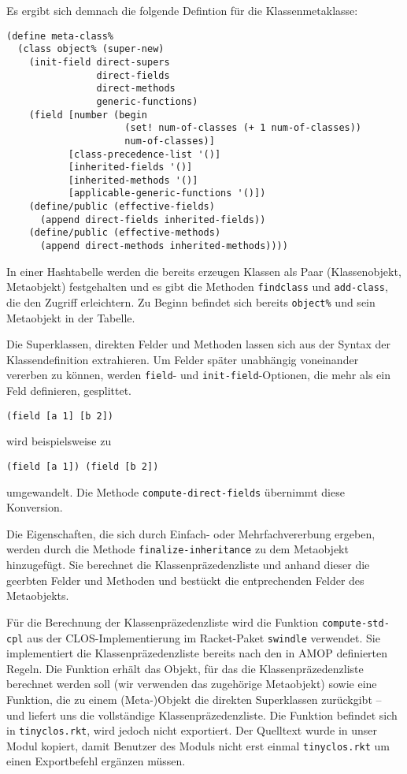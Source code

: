 Es ergibt sich demnach die folgende Defintion für die Klassenmetaklasse:

\begin{lstlisting}
(define meta-class%
  (class object% (super-new)
    (init-field direct-supers
                direct-fields
                direct-methods
                generic-functions)
    (field [number (begin 
                     (set! num-of-classes (+ 1 num-of-classes))
                     num-of-classes)]
           [class-precedence-list '()]
           [inherited-fields '()]
           [inherited-methods '()]
           [applicable-generic-functions '()])    
    (define/public (effective-fields)
      (append direct-fields inherited-fields))
    (define/public (effective-methods)
      (append direct-methods inherited-methods))))
\end{lstlisting}

In einer Hashtabelle werden die bereits erzeugen Klassen als Paar (Klassenobjekt, Metaobjekt) festgehalten und es gibt die Methoden \texttt{findclass} und \texttt{add-class}, die den Zugriff erleichtern. Zu Beginn befindet sich bereits \texttt{object\%} und sein Metaobjekt in der Tabelle.

Die Superklassen, direkten Felder und Methoden lassen sich aus der Syntax der Klassendefinition extrahieren. Um Felder später unabhängig voneinander vererben zu können, werden \texttt{field}- und \texttt{init-field}-Optionen, die mehr als ein Feld definieren, gesplittet. 

\texttt{(field [a 1] [b 2])}

wird beispielsweise zu

\texttt{(field [a 1]) (field [b 2])}

umgewandelt. Die Methode \texttt{compute-direct-fields} übernimmt diese Konversion.

Die Eigenschaften, die sich durch Einfach- oder Mehrfachvererbung ergeben, werden durch die Methode \texttt{finalize-inheritance} zu dem Metaobjekt hinzugefügt. Sie berechnet die Klassenpräzedenzliste und anhand dieser die geerbten Felder und Methoden und bestückt die entprechenden Felder des Metaobjekts.

Für die Berechnung der Klassenpräzedenzliste wird die Funktion \texttt{compute-std-cpl} aus der CLOS-Implementierung im Racket-Paket \texttt{swindle} verwendet. Sie implementiert die Klassenpräzedenzliste bereits nach den in AMOP definierten Regeln. Die Funktion erhält das Objekt, für das die Klassenpräzedenzliste berechnet werden soll (wir verwenden das zugehörige Metaobjekt) sowie eine Funktion, die zu einem (Meta-)Objekt die direkten Superklassen zurückgibt -- und liefert uns die vollständige Klassenpräzedenzliste. Die Funktion befindet sich in \texttt{tinyclos.rkt}, wird jedoch nicht exportiert. Der Quelltext wurde in unser Modul kopiert, damit Benutzer des Moduls nicht erst einmal \texttt{tinyclos.rkt} um einen Exportbefehl ergänzen müssen. 

